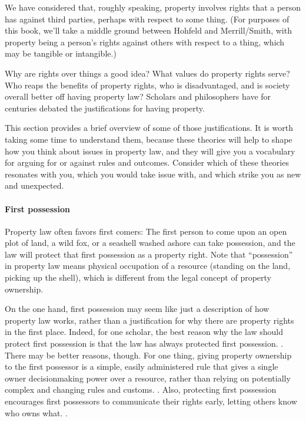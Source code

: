 
We have considered that, roughly speaking, property involves rights that a
person has against third parties, perhaps with respect to some thing. (For
purposes of this book, we'll take a middle ground between Hohfeld and
Merrill/Smith, with property being a person's rights against others with respect
to a thing, which may be tangible or intangible.)

Why are rights over things a good idea? What values do property rights serve?
Who reaps the benefits of property rights, who is disadvantaged, and is society
overall better off having property law? Scholars and philosophers have for
centuries debated the justifications for having property.

This section provides a brief overview of some of those justifications. It is
worth taking some time to understand them, because these theories will help to
shape how you think about issues in property law, and they will give you a
vocabulary for arguing for or against rules and outcomes. Consider which of
these theories resonates with you, which you would take issue with, and which
strike you as new and unexpected.





\paragraph{First possession} Property law often favors first comers: The first
person to come upon an open plot of land, a wild fox, or a seashell washed
ashore can take possession, and the law will protect that first possession as a
property right. Note that ``possession'' in property law means physical
occupation of a resource (standing on the land, picking up the shell), which is
different from the legal concept of property ownership.

On the one hand, first possession may seem like just a description of how
property law works, rather than a justification for why there are property
rights in the first place. Indeed, for one scholar, the best reason why the law
should protect first possession is that the law has always protected first
possession. . There may be
better reasons, though. For one thing, giving property ownership to the first
possessor is a simple, easily administered rule that gives a single owner
decisionmaking power over a resource, rather than relying on potentially complex
and changing rules and customs. . Also, protecting first possession encourages first possessors to
communicate their rights early, letting others know who owns what. .


